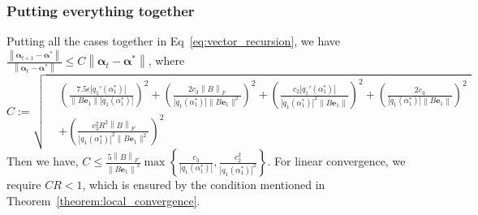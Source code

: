 \documentclass[letterpaper]{article}
\newcommand{\bas}[1]{\begin{align*}#1\end{align*}}
\newcommand{\balpha}{\pmb{\alpha}}
\newcommand{\be}{\pmb{e}}
\newcommand{\norm}[1]{\left\|#1\right\|}
\newcommand{\bb}[1]{\left(#1\right)}
\begin{document}
\subsubsection{Putting everything together}
Putting all the cases together in Eq~\ref{eq:vector_recursion}, we have $\frac{\left\|\balpha_{t+1}-\balpha^{*}\right\|}{\left\|\balpha_{t}-\balpha^{*}\right\|} \leq C\left\|\balpha_{t}-\balpha^{*}\right\|$, where 
\[
C := \sqrt{
    \begin{aligned}
        &\bb{\frac{7.5\epsilon \left|q_{1}'\bb{\alpha^{*}_{1}}\right|}{\|B\be_{1}\|\left|q_{1}\bb{\alpha^{*}_{1}}\right|}}^{2} + 
        \bb{\frac{2c_{3}\left\|B\right\|_{F}}{|q_{1}\bb{\alpha^{*}_{1}}|\|B\be_{1}\|^{2}}}^{2} + \bb{\frac{c_{2}\left|q_{1}'\bb{\alpha^{*}_{1}}\right|}{\left|q_{1}\bb{\alpha^{*}_{1}}\right|^{2}\left\|B\be_{1}\right\|}}^{2} + \bb{\frac{2c_{3}}{\left|q_{1}\bb{\alpha^{*}_{1}}\right|\left\|B\be_{1}\right\|}}^{2} \\ 
        & + \bb{\frac{c_{3}^{2}R^{2}\left\|B\right\|_{F}}{\left|q_{1}\bb{\alpha^{*}_{1}}\right|^{2}\|B\be_{1}\|^{2}}}^{2}
    \end{aligned}
}
\]
Then we have, $C \leq \frac{5\norm{B}_{F}}{\norm{B\mathbf{e}_{1}}^{2}}\max\left\{\frac{c_{3}}{\left|q_{1}\bb{\alpha^{*}_{1}}\right|}, \frac{c_{2}^{2}}{\left|q_{1}\bb{\alpha^{*}_{1}}\right|^{2}}\right\}$.
For linear convergence, we require $CR < 1$, which is ensured by the condition mentioned in Theorem~\ref{theorem:local_convergence}.
\end{document}

